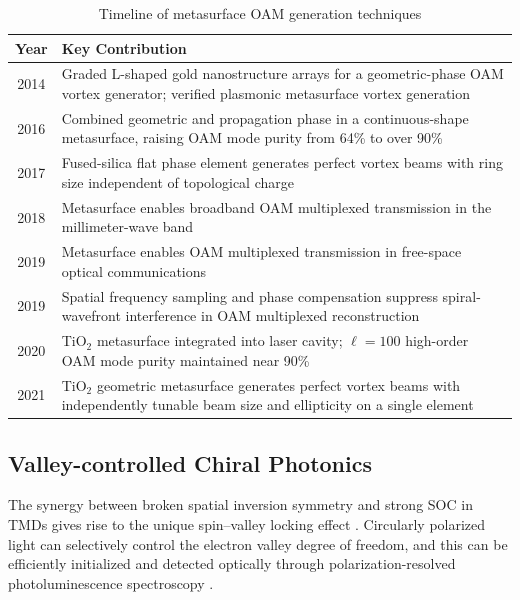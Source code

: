 \begin{table}[H]
\centering
\caption{Timeline of metasurface OAM generation techniques}
\label{tab:timeline_oam}
\small
\begin{tabular}{c p{11cm}}
\toprule
\textbf{Year} & \textbf{Key Contribution} \\
\midrule
2014 & Graded L-shaped gold nanostructure arrays for a geometric-phase OAM vortex generator; verified plasmonic metasurface vortex generation \cite{karimi2014generating} \\
2016 & Combined geometric and propagation phase in a continuous-shape metasurface, raising OAM mode purity from 64\% to over 90\% \cite{guo2016merging} \\
2017 & Fused-silica flat phase element generates perfect vortex beams with ring size independent of topological charge \cite{liu2017generation} \\
2018 & Metasurface enables broadband OAM multiplexed transmission in the millimeter-wave band \cite{bi2018metasurface} \\
2019 & Metasurface enables OAM multiplexed transmission in free-space optical communications \cite{tan2019free} \\
2019 & Spatial frequency sampling and phase compensation suppress spiral-wavefront interference in OAM multiplexed reconstruction \cite{ren2019metasurface} \\
2020 & TiO$_2$ metasurface integrated into laser cavity; $\ell=100$ high-order OAM mode purity maintained near 90\% \cite{sroor2020high} \\
2021 & TiO$_2$ geometric metasurface generates perfect vortex beams with independently tunable beam size and ellipticity on a single element \cite{zhou2021generation} \\
\bottomrule
\end{tabular}
\end{table}


\subsection{Valley-controlled Chiral Photonics}

The synergy between broken spatial inversion symmetry and strong SOC in TMDs gives rise to the unique spin--valley locking effect \cite{xiao2012coupled}. Circularly polarized light can selectively control the electron valley degree of freedom, and this can be efficiently initialized and detected optically through polarization-resolved photoluminescence spectroscopy \cite{mak2012control, zeng2012valley, schaibley2016valleytronics}.

